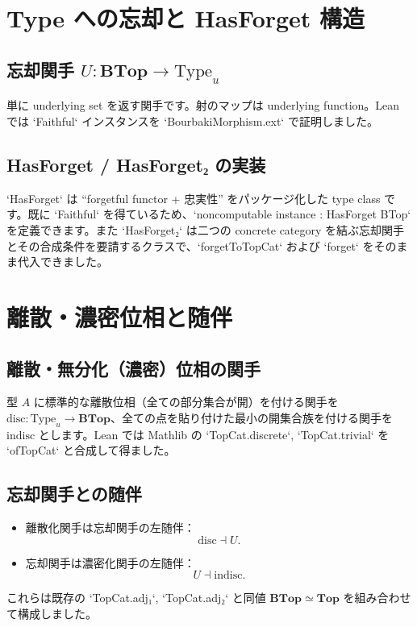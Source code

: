 \documentclass[12pt]{ltjsarticle}
\begin{document}
\section{Type への忘却と HasForget 構造}
\subsection{忘却関手 \(U : \mathbf{BTop} \to \mathrm{Type}_u\)}
単に underlying set を返す関手です。射のマップは underlying function。Lean では `Faithful` インスタンスを `BourbakiMorphism.ext` で証明しました。

\subsection{HasForget / HasForget₂ の実装}
`HasForget` は ``forgetful functor + 忠実性'' をパッケージ化した type class です。既に `Faithful` を得ているため、`noncomputable instance : HasForget BTop` を定義できます。また `HasForget₂` は二つの concrete category を結ぶ忘却関手とその合成条件を要請するクラスで、`forgetToTopCat` および `forget` をそのまま代入できました。

\section{離散・濃密位相と随伴}
\subsection{離散・無分化（濃密）位相の関手}
型 \(A\) に標準的な離散位相（全ての部分集合が開）を付ける関手を \(\mathrm{disc} : \mathrm{Type}_u \to \mathbf{BTop}\)、全ての点を貼り付けた最小の開集合族を付ける関手を \(\mathrm{indisc}\) とします。Lean では Mathlib の `TopCat.discrete`, `TopCat.trivial` を `ofTopCat` と合成して得ました。

\subsection{忘却関手との随伴}
\begin{itemize}
  \item 離散化関手は忘却関手の左随伴：
  \[
    \mathrm{disc} \dashv U.
  \]
  \item 忘却関手は濃密化関手の左随伴：
  \[
    U \dashv \mathrm{indisc}.
  \]
\end{itemize}
これらは既存の `TopCat.adj₁`, `TopCat.adj₂` と同値 \(\mathbf{BTop} \simeq \mathbf{Top}\) を組み合わせて構成しました。
\end{document}
